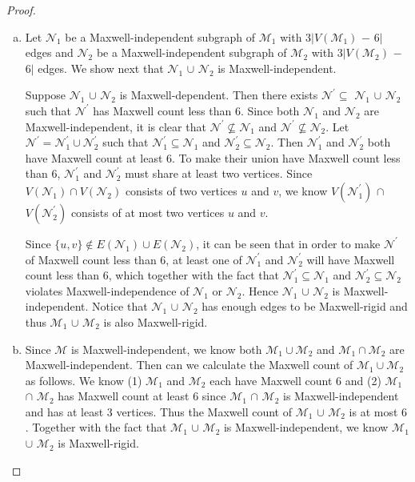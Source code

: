 \documentclass[10pt]{article}
\def\M{\mathcal {M}}
\def\N{\mathcal {N}}
\begin{document}
\begin{proof}
\begin{enumerate}[(a)]
\item Let $\N_1$ be a Maxwell-independent subgraph of $\M_1$ with $3|V(\M_1)$ $-$ $6|$ edges and $\N_2$ be a Maxwell-independent subgraph of $\M_2$ with $3|V(\M_2)$ $-$ $6|$ edges. We show next that $\N_1$ $\cup$ $\N_2$ is Maxwell-independent.

 Suppose $\N_1$ $\cup$ $\N_2$ is Maxwell-dependent. Then there exists $\N^\prime \subseteq$ $\N_1$ $\cup$ $\N_2$ such that $\N^\prime$ has Maxwell count less than $6$. Since both $\N_1$ and $\N_2$ are Maxwell-independent, it is clear that $\N^\prime \nsubseteq \N_1$ and $\N^\prime \nsubseteq \N_2$. Let $\N^\prime=\N_1^\prime \cup \N_2^\prime$ such that $\N_1^\prime \subseteq \N_1$ and $\N_2^\prime \subseteq \N_2$. Then $\N_1^\prime$ and $\N_2^\prime$ both have Maxwell count at least 6. To make their union have Maxwell count less than 6, $\N_1^\prime$ and $\N_2^\prime$ must share at least two vertices. Since $V(\N_1) \cap V(\N_2)$ consists of two vertices $u$ and $v$, we know $V(\N_1^\prime)$ $\cap$ $V(\N_2^\prime)$ consists of at most two vertices $u$ and $v$.

Since $\{u, v\}\notin E(\N_1)\cup E(\N_2)$, it can be seen that in order to make $\N^\prime$ of Maxwell count less than $6$, at least one of $\N_1^\prime$ and $\N_2^\prime$ will have Maxwell count less than $6$, which together with the fact that $\N_1^\prime \subseteq \N_1$ and $\N_2^\prime \subseteq \N_2$ violates Maxwell-independence of $\N_1$ or $\N_2$. Hence $\N_1$ $\cup$ $\N_2$ is Maxwell-independent. Notice that $\N_1$ $\cup$ $\N_2$ has enough edges to be Maxwell-rigid and thus $\M_1$ $\cup$ $\M_2$ is also Maxwell-rigid.

\item Since $\M$ is Maxwell-independent, we know both $\M_1 \cup \M_2$  and $\M_1 \cap \M_2$ are Maxwell-independent. Then can we calculate the Maxwell count of $\M_1 \cup \M_2$ as follows. We know (1) $\M_1$ and $\M_2$ each have Maxwell count $6$ and (2) $\M_1$ $\cap$ $\M_2$ has Maxwell count at least $6$ since $\M_1$ $\cap$ $\M_2$ is Maxwell-independent and has at least $3$ vertices. Thus the Maxwell count of $\M_1$ $\cup$ $\M_2$ is at most $6$. Together with the fact that $\M_1$ $\cup$ $\M_2$ is Maxwell-independent, we know $\M_1$ $\cup$ $\M_2$ is Maxwell-rigid.
\end{enumerate}
\end{proof}
\end{document}
